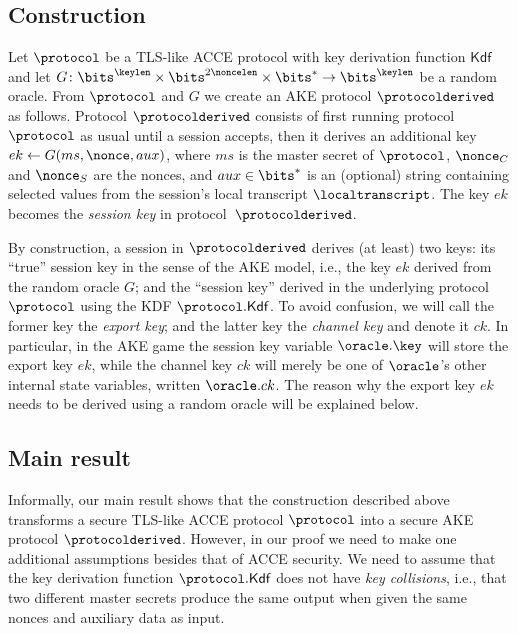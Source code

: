 \subsection{Construction}\label{sec:construction:PI+}
Let $\protocol$ be a TLS-like ACCE protocol with key derivation function $\mathsf{Kdf}$
and let $G \colon \bits^{\keylen} \times \bits^{2\noncelen} \times \bits^{*} \to \bits^\keylen$ be a random oracle.
From $\protocol$ and $G$ we create an AKE protocol $\protocolderived$ as follows.
Protocol $\protocolderived$ consists of first running protocol $\protocol$ as usual until a session accepts,
then it derives an additional key $ek \gets G(ms, \nonce, aux)$,
where $ms$ is the master secret of $\protocol$,
$\nonce_{C}$ and $\nonce_{S}$ are the nonces,
and $aux \in \bits^*$ is an (optional) string containing selected values from the session's local transcript $\localtranscript$.
The key $ek$ becomes the \emph{session key} in protocol~$\protocolderived$.


By construction,
a session in $\protocolderived$ derives (at least) two keys:
its ``true'' session key in the sense of the AKE model,
i.e., the key $ek$ derived from the random oracle $G$;
and the ``session key'' derived in the underlying protocol $\protocol$
using the KDF $\protocol.\mathsf{Kdf}$.
To avoid confusion,
we will call the former key the \emph{export key};
and the latter key the \emph{channel key} and denote it $ck$.
%
In particular,
in the AKE game
the session key variable $\oracle.\key$ will store the export key $ek$,
while the channel key $ck$ will merely be one of $\oracle$'s other internal state variables,
written $\oracle.ck$.
The reason why the export key $ek$ needs to be derived using a random oracle will be explained below.


\subsection{Main result}

Informally, our main result shows that the construction described above transforms a secure TLS-like ACCE protocol $\protocol$ into a secure AKE protocol $\protocolderived$.
However, 
in our proof we need to make one additional assumptions besides that of ACCE security.
We need to assume that the key derivation function $\protocol.\mathsf{Kdf}$ does not have \emph{key collisions},
i.e.,
that two different master secrets produce the same output when given the same nonces and auxiliary data as input.



